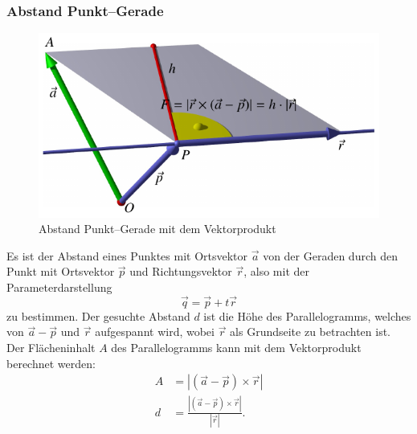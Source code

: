 \subsubsection{Abstand Punkt--Gerade}
\begin{figure}
\begin{center}
\includegraphics{5/images/abstand.pdf}
\end{center}
\caption{Abstand Punkt--Gerade mit dem Vektorprodukt\label{punkt-gerade}}
\end{figure}
Es ist der Abstand eines Punktes mit Ortsvektor $\vec a$ von der
Geraden durch den Punkt mit Ortsvektor $\vec p$ und Richtungsvektor $\vec r$,
also mit der Parameterdarstellung
\[
\vec q=\vec p+t\vec r
\]
zu bestimmen.
Der gesuchte Abstand $d$ ist die Höhe des Parallelogramms,
welches von $\vec a-\vec p$
und $\vec r$ aufgespannt wird, wobei $\vec r$ als Grundseite zu betrachten ist.
Der Flächeninhalt $A$ des Parallelogramms kann mit dem Vektorprodukt
berechnet werden:
\begin{align*}
A&=|(\vec a-\vec p)\times\vec r|\\
d&=\frac{|(\vec a-\vec p)\times\vec r|}{|\vec r|}.
\end{align*}
